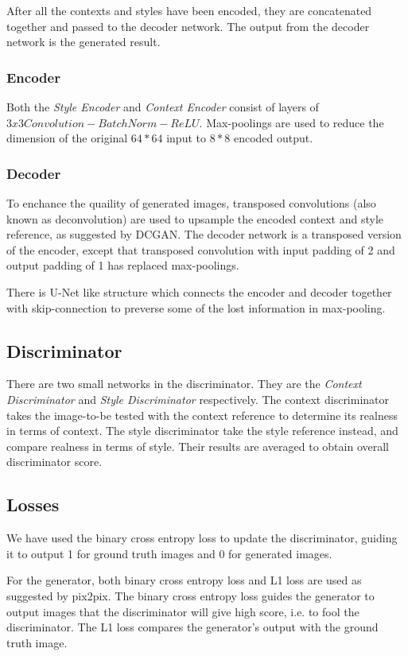 \documentclass[10pt,twocolumn,letterpaper]{article}
\begin{document}
After all the contexts and styles have been encoded, they are concatenated together and passed to the decoder network. The output from the decoder network is the generated result.

\subsubsection{Encoder}
Both the \textit{Style Encoder} and \textit{Context Encoder} consist of layers of $3x3Convolution - BatchNorm - ReLU$. Max-poolings are used to reduce the dimension of the original $64*64$ input to $8*8$ encoded output. 

\subsubsection{Decoder}
To enchance the quaility of generated images, transposed convolutions (also known as deconvolution) are used to upsample the encoded context and style reference, as suggested by DCGAN\cite{DBLP:journals/corr/RadfordMC15}. The decoder network is a transposed version of the encoder, except that transposed convolution with input padding of 2 and output padding of 1 has replaced max-poolings.

There is U-Net\cite{DBLP:journals/corr/RonnebergerFB15} like structure which connects the encoder and decoder together with skip-connection to preverse some of the lost information in max-pooling.

\subsection{Discriminator}
There are two small networks in the discriminator. They are the  \textit{Context Discriminator} and \textit{Style Discriminator} respectively. The context discriminator takes the image-to-be tested with the context reference to determine its realness in terms of context. The style discriminator take the style reference instead, and compare realness in terms of style. Their results are averaged to obtain overall discriminator score.

\subsection{Losses}
We have used the binary cross entropy loss to update the discriminator, guiding it to output 1 for ground truth images and 0 for generated images. 

For the generator, both binary cross entropy loss and L1 loss are used as suggested by pix2pix. The binary cross entropy loss guides the generator to output images that the discriminator will give high score, i.e. to fool the discriminator. The L1 loss compares the generator's output with the ground truth image.
\end{document}
